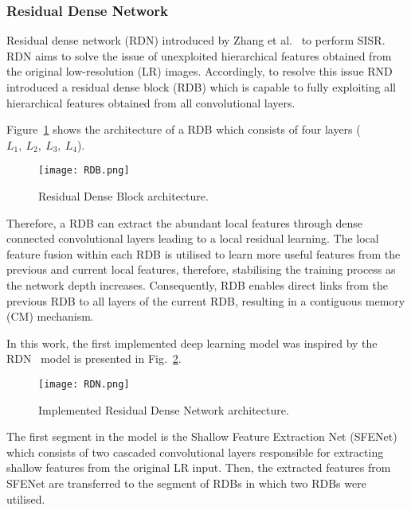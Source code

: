 \subsubsection{Residual Dense Network}
Residual dense network (RDN) introduced by Zhang et al.~\cite{Zhang2018} to perform SISR.
RDN aims to solve the issue of unexploited hierarchical features obtained from the original low-resolution (LR) images.
Accordingly, to resolve this issue RND introduced a residual dense block (RDB) which is capable to fully exploiting all hierarchical features obtained from all convolutional layers.

Figure~\ref{fig:RDB} shows the architecture of a RDB which consists of four  layers (\(L_1,\ L_2,\ L_3,\ L_4\)).
\begin{figure} [h!]
	\begin{center}
		\texttt{[image: RDB.png]}
	\end{center}
	\caption{Residual Dense Block architecture.} 
	\label{fig:RDB}
\end{figure}
Therefore, a RDB can extract the abundant local features through dense connected convolutional layers leading to a local residual learning.
The local feature fusion within each RDB is utilised to learn more useful features from the previous and current local features, therefore, stabilising the training process as the network depth increases.
Consequently, RDB enables direct links from the previous RDB to all layers of the current RDB, resulting in a contiguous memory (CM) mechanism.

In this work, the first implemented deep learning model was inspired by the RDN~\cite{Zhang2018} model is presented in Fig.~\ref{fig:RDN}.
\begin{figure} [h!]
	\begin{center}
		\texttt{[image: RDN.png]}
	\end{center}
	\caption{Implemented Residual Dense Network architecture.} 
	\label{fig:RDN}
\end{figure}
The first segment in the model is the Shallow Feature Extraction Net (SFENet) which consists of two cascaded convolutional layers responsible for extracting shallow features from the original LR input.
Then, the extracted features from SFENet are transferred to the segment of RDBs in which two RDBs were utilised.

